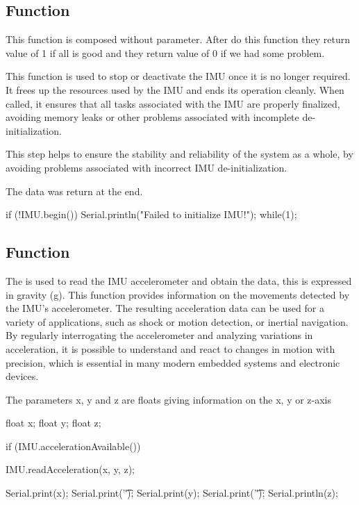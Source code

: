 \subsection{Function } 

This function is composed without parameter. After do this function they return value of 1 if all is good and they return value of 0 if we had some problem.

This function is used to stop or deactivate the IMU once it is no longer required. It frees up the resources used by the IMU and ends its operation cleanly. When called, it ensures that all tasks associated with the IMU are properly finalized, avoiding memory leaks or other problems associated with incomplete de-initialization.

This step helps to ensure the stability and reliability of the system as a whole, by avoiding problems associated with incorrect IMU de-initialization.

The data was return at the end. 

\begin{Arduino}
	if (!IMU.begin()) {
		Serial.println("Failed to initialize IMU!");
		while(1){}; }
\end{Arduino}


\subsection{Function }

The  is used to read the IMU accelerometer and obtain the data, this is expressed in gravity (g). This function provides information on the movements detected by the IMU's accelerometer. The resulting acceleration data can be used for a variety of applications, such as shock or motion detection, or inertial navigation. By regularly interrogating the accelerometer and analyzing variations in acceleration, it is possible to understand and react to changes in motion with precision, which is essential in many modern embedded systems and electronic devices.

The parameters x, y and z are floats giving information on the x, y or z-axis 

\begin{Arduino}
	
	float x; 
	float y; 
	float z;
	
	if (IMU.accelerationAvailable()) {
		IMU.readAcceleration(x, y, z);
		
		Serial.print(x);
		Serial.print('\t');
		Serial.print(y);
		Serial.print('\t');
		Serial.println(z);	}
\end{Arduino}


